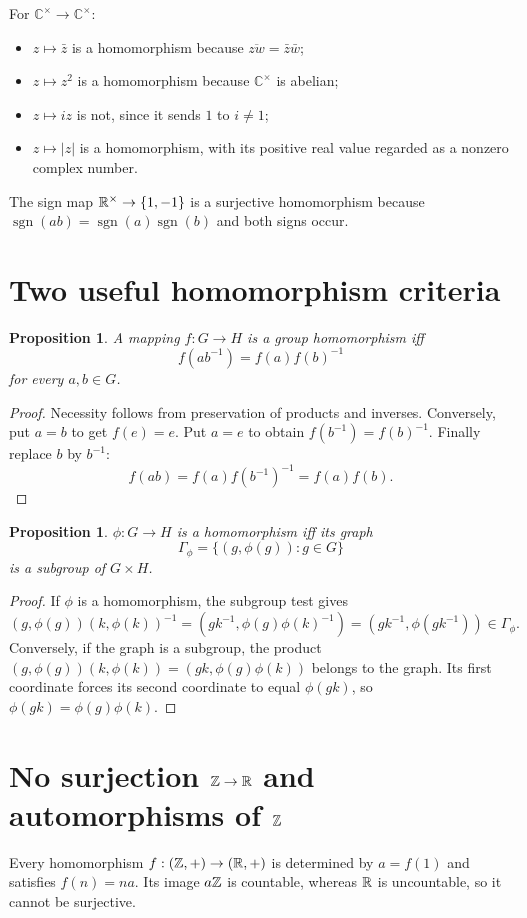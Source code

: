 \documentclass[11pt,openany]{book}
\newcommand{\C}{\mathbb C}\newcommand{\PP}{\mathcal P}
\newtheorem{proposition}[theorem]{Proposition}
\theoremstyle{definition}
\begin{document}
For $\C^\times\to\C^\times$:
\begin{itemize}
\item $z\mapsto\bar z$ is a homomorphism because $\overline{zw}=\bar z\bar w$;
\item $z\mapsto z^2$ is a homomorphism because $\C^\times$ is abelian;
\item $z\mapsto iz$ is not, since it sends $1$ to $i\ne1$;
\item $z\mapsto|z|$ is a homomorphism, with its positive real value regarded as a nonzero complex number.
\end{itemize}

The sign map $\mathbb R^\times\to\{1,-1\}$ is a surjective homomorphism because $\operatorname{sgn}(ab)=\operatorname{sgn}(a)\operatorname{sgn}(b)$ and both signs occur.

\section{Two useful homomorphism criteria}
\begin{proposition}
A mapping $f:G\to H$ is a group homomorphism iff
\[
f(ab^{-1})=f(a)f(b)^{-1}
\]
for every $a,b\in G$.
\end{proposition}
\begin{proof}
Necessity follows from preservation of products and inverses. Conversely, put $a=b$ to get $f(e)=e$. Put $a=e$ to obtain $f(b^{-1})=f(b)^{-1}$. Finally replace $b$ by $b^{-1}$:
\[
f(ab)=f(a)f(b^{-1})^{-1}=f(a)f(b).
\]
\end{proof}

\begin{proposition}
$\phi:G\to H$ is a homomorphism iff its graph
\[
\Gamma_\phi=\{(g,\phi(g)):g\in G\}
\]
is a subgroup of $G\times H$.
\end{proposition}
\begin{proof}
If $\phi$ is a homomorphism, the subgroup test gives
\[
(g,\phi(g))(k,\phi(k))^{-1}
=(gk^{-1},\phi(g)\phi(k)^{-1})
=(gk^{-1},\phi(gk^{-1}))\in\Gamma_\phi.
\]
Conversely, if the graph is a subgroup, the product
$(g,\phi(g))(k,\phi(k))=(gk,\phi(g)\phi(k))$ belongs to the graph. Its first coordinate forces its second coordinate to equal $\phi(gk)$, so $\phi(gk)=\phi(g)\phi(k)$.
\end{proof}

\section{No surjection $\mathbb Z\to\mathbb R$ and automorphisms of $\mathbb Z$}
Every homomorphism $f:(\mathbb Z,+)\to(\mathbb R,+)$ is determined by $a=f(1)$ and satisfies $f(n)=na$. Its image $a\mathbb Z$ is countable, whereas $\mathbb R$ is uncountable, so it cannot be surjective.
\end{document}
